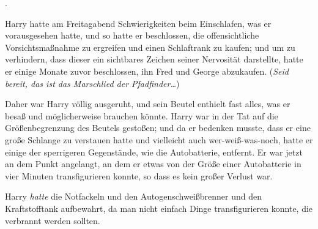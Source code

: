 
.

\hplettrineextrapara
Harry hatte am Freitagabend Schwierigkeiten beim Einschlafen, was er vorausgesehen hatte, und so hatte er beschlossen, die offensichtliche Vorsichtsmaßnahme zu ergreifen und einen Schlaftrank zu kaufen; und um zu verhindern, dass dieser ein sichtbares Zeichen seiner Nervosität darstellte, hatte er einige Monate zuvor beschlossen, ihn Fred und George abzukaufen. (\emph{Seid bereit, das ist das Marschlied der Pfadfinder…})

Daher war Harry völlig ausgeruht, und sein Beutel enthielt fast alles, was er besaß und möglicherweise brauchen könnte. Harry war in der Tat auf die Größenbegrenzung des Beutels gestoßen; und da er bedenken musste, dass er eine große Schlange zu verstauen hatte und vielleicht auch wer-weiß-was-noch, hatte er einige der sperrigeren Gegenstände, wie die Autobatterie, entfernt. Er war jetzt an dem Punkt angelangt, an dem er etwas von der Größe einer Autobatterie in vier Minuten transfigurieren konnte, so dass es kein großer Verlust war.

Harry \emph{hatte} die Notfackeln und den Autogenschweißbrenner und den Kraftstofftank aufbewahrt, da man nicht einfach Dinge transfigurieren konnte, die verbrannt werden sollten.

